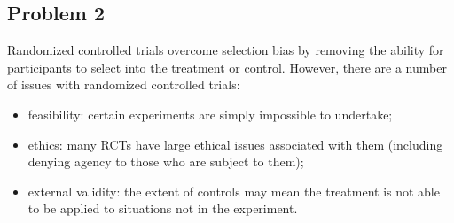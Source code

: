 \documentclass[8pt]{extarticle}
\begin{document}
\subsection{Problem 2}%
Randomized controlled trials overcome selection bias by removing the ability for participants to select into the treatment or control. However, there are a number of issues with randomized controlled trials:
\begin{itemize}
  \item feasibility: certain experiments are simply impossible to undertake;
  \item ethics: many RCTs have large ethical issues associated with them (including denying agency to those who are subject to them);
  \item external validity: the extent of controls may mean the treatment is not able to be applied to situations not in the experiment.
\end{itemize}
\end{document}
